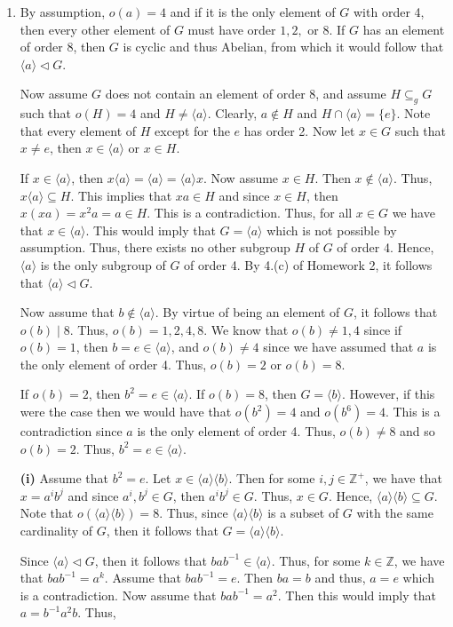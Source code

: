 \documentclass[12pt]{article}
\makeatletter
\theoremstyle{definition}
\theoremstyle{remark}
\renewenvironment{proof}[1][\proofname]{\par
  \pushQED{\qed}%
  \normalfont \topsep6\p@\@plus6\p@\relax
  \list{}{\leftmargin=0mm
          \rightmargin=4mm
          \settowidth{\itemindent}{\itshape#1}%
          \labelwidth=\itemindent
          \parsep=0pt \listparindent=\parindent 
  }
  \item[\hskip\labelsep
        \itshape
    #1\@addpunct{.}]\ignorespaces
}{%
  \popQED\endlist\@endpefalse
}
\let\oldproofname=\proofname
\renewcommand{\proofname}{\bf{\textit{\oldproofname}}}
\makeatother
\begin{document}
\begin{enumerate}[leftmargin=*]
\begin{enumerate}[label=(\alph*)]
\begin{proof}
                        By assumption, $o(a)=4$ and if it is the only element of $G$ with order 4, then every other element of $G$ must have order $1, 2, $ or 8. If $G$ has an element of order 8, then $G$ is cyclic and thus Abelian, from which it would follow that $\langle a\rangle\triangleleft G$.\par\hspace{4mm} Now assume $G$ does not contain an element of order 8, and assume $H\subseteq_g G$ such that $o(H)=4$ and $H\neq\langle a\rangle$. Clearly, $a\notin H$ and $H\cap\langle a\rangle =\{e\}$. Note that every element of $H$ except for the $e$ has order 2. Now let $x\in G$ such that $x\neq e$, then $x\in \langle a\rangle$ or $x\in H$.\par\hspace{4mm} If $x\in\langle a\rangle$, then  $x\langle a\rangle=\langle a\rangle=\langle a\rangle x$. Now assume $x\in H$. Then $x\notin\langle a\rangle$. Thus, $x\langle a\rangle\subseteq H$. This implies that $xa\in H$ and since $x\in H$, then $x(xa)=x^2a=a\in H$. This is a contradiction. Thus, for all $x\in G$ we have that $x\in\langle a\rangle$. This would imply that $G=\langle a\rangle$ which is not possible by assumption. Thus, there exists no other subgroup $H$ of $G$ of order 4. Hence, $\langle a\rangle$ is the only subgroup of $G$ of order 4. By 4.(c) of Homework 2, it follows that $\langle a\rangle\triangleleft G$.\par\hspace{4mm} Now assume that $b\notin\langle a\rangle$. By virtue of being an element of $G$, it follows that $o(b)\mid 8$. Thus, $o(b)=1,2,4,8$. We know that $o(b)\neq 1, 4$ since if $o(b)=1$, then $b=e\in\langle a\rangle$, and $o(b)\neq 4$ since we have assumed that $a$ is the only element of order 4. Thus, $o(b)=2$ or $o(b)=8$.\par\hspace{4mm} If $o(b)=2$, then $b^2=e\in\langle a\rangle$. If $o(b)=8$, then $G=\langle b\rangle$. However, if this were the case then we would have that $o(b^2)=4$ and $o(b^6)=4$. This is a contradiction since $a$ is the only element of order 4. Thus, $o(b)\neq 8$ and so $o(b)=2$. Thus, $b^2=e\in\langle a\rangle$.\par\hspace{4mm} \textbf{(i)} Assume that $b^2=e$. Let $x\in\langle a\rangle\langle b\rangle$. Then for some $i,j\in\mathbb{Z}^{+}$, we have that $x=a^ib^j$ and since $a^i,b^j\in G$, then $a^ib^j\in G$. Thus, $x\in G$. Hence, $\langle a\rangle\langle b\rangle\subseteq G$. Note that $o(\langle a\rangle\langle b\rangle)=8$. Thus, since $\langle a\rangle\langle b\rangle$ is a subset of $G$ with the same cardinality of $G$, then it follows that $G=\langle a\rangle\langle b\rangle$.\par\hspace{4mm} Since $\langle a\rangle\triangleleft G$, then it follows that $bab^{-1}\in\langle a\rangle$. Thus, for some $k\in\mathbb{Z}$, we have that $bab^{-1}=a^k$. Assume that $bab^{-1}=e$. Then $ba=b$ and thus, $a=e$ which is a contradiction. Now assume that $bab^{-1}=a^2$. Then this would imply that $a=b^{-1}a^2b$. Thus, 
\end{proof}
\end{enumerate}
\end{enumerate}
\end{document}
